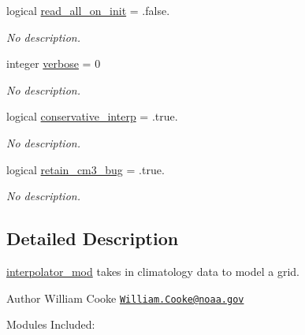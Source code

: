 \begin{DoxyCompactItemize}
logical \hyperlink{namespaceinterpolator__mod_a49f7ebdd829e5d12ff598563cc5d5da3}{read\+\_\+all\+\_\+on\+\_\+init} = .false.
\begin{DoxyCompactList}\small\item\em No description. \end{DoxyCompactList}\item 
integer \hyperlink{namespaceinterpolator__mod_a5d5367264c6c0ed9fee5860d5a4b7907}{verbose} = 0
\begin{DoxyCompactList}\small\item\em No description. \end{DoxyCompactList}\item 
logical \hyperlink{namespaceinterpolator__mod_ae010f7c89ab86c9aa2884654abf213cd}{conservative\+\_\+interp} = .true.
\begin{DoxyCompactList}\small\item\em No description. \end{DoxyCompactList}\item 
logical \hyperlink{namespaceinterpolator__mod_af73f2416a68c1ea8cc2fac7be3b4ab5e}{retain\+\_\+cm3\+\_\+bug} = .true.
\begin{DoxyCompactList}\small\item\em No description. \end{DoxyCompactList}\end{DoxyCompactItemize}


\subsection{Detailed Description}
\hyperlink{namespaceinterpolator__mod}{interpolator\+\_\+mod} takes in climatology data to model a grid. 

\begin{DoxyAuthor}{Author}
William Cooke \href{mailto:William.Cooke@noaa.gov}{\tt William.\+Cooke@noaa.\+gov}
\end{DoxyAuthor}
Modules Included\+:


